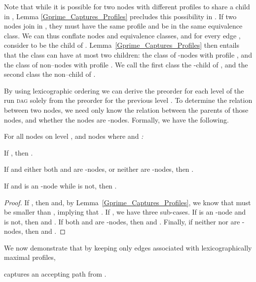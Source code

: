 \documentclass{LMCS}
\newcommand{\DAG}{\textsc{dag}\xspace}
\begin{document}
Note that while it is possible for two nodes with different profiles to share a child in ,
Lemma \ref{Gprime_Captures_Profiles} precludes this possibility in . If two nodes join in
, they must have the same profile and be in the same equivalence class.  We can thus
conflate nodes and equivalence classes, and for every edge , consider  to be the
child of .  Lemma~\ref{Gprime_Captures_Profiles} then entails that the class  can have at
most two children: the class of -nodes with profile , and the class of non--nodes with
profile . We call the first class the -child of , and the second class the
non--child of .

By using lexicographic ordering we can derive the preorder for each level  of the run \DAG
solely from the preorder for the previous level .  To determine the relation between two nodes,
we need only know the relation between the parents of those nodes, and whether the nodes are
-nodes. Formally, we have the following.

\begin{lem}\label{Lexicographic_Ordering}
For all nodes  on level , and nodes  where 
and \emph{:}
\begin{iteMize}{}
\item If , then .
\item If  and either both  and  are -nodes, or neither are -nodes,
then .
\item If  and  is an -node while  is not, then .
\end{iteMize}
\end{lem}
\begin{proof}
If , then  and, by Lemma~\ref{Gprime_Captures_Profiles}, we know that  must be smaller than , implying that .  If , we have three sub-cases. If  is an -node and
 is not, then  and . If 
both  and  are -nodes, then  and .  Finally, if neither  nor  are -nodes, then  and .
\end{proof}

We now demonstrate that by keeping only edges associated with lexicographically maximal profiles,
 
captures an accepting path from .  
\end{document}
